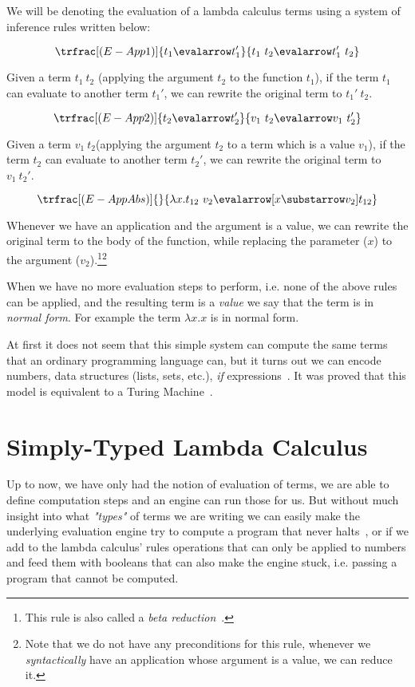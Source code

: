 We will be denoting the evaluation of a lambda calculus terms using a system of inference rules written below:

\[
       \trfrac[(E-App1)]
       {t_1 \evalarrow t_1'}
       {t_1\ t_2 \evalarrow t_1'\ t_2}
\]

Given a term $t_1\ t_2$ (applying the argument $t_2$ to the function $t_1$), if the term $t_1$ can evaluate to another term $t_1'$, we can rewrite the original term to $t_1'\ t_2$.


\[
       \trfrac[(E-App2)]
       {t_2 \evalarrow t_2'}
       {v_1\ t_2 \evalarrow v_1\ t_2'}
\]

Given a term $v_1\ t_2$(applying the argument $t_2$ to a term which is a value $v_1$), if the term $t_2$ can evaluate to another term $t_2'$, we can rewrite the original term to $v_1\ t_2'$.

\[
       \trfrac[(E-AppAbs)]
       {}
       {\lambda x.t_{12}\ v_2 \evalarrow [x \substarrow v_2]t_{12}}
\]

Whenever we have an application and the argument is a value, we can rewrite the original term to the body of the function, while replacing the parameter ($x$) to the argument ($v_2$).\footnote{This rule is also called a \emph{beta reduction}~\cite{tapl}.}\footnote{Note that we do not have any preconditions for this rule, whenever we \emph{syntactically} have an application whose argument is a value, we can reduce it.}

\begin{definition}
       When we have no more evaluation steps to perform, i.e. none of the above rules can be applied, and the resulting term is a \emph{value} we say that the term is in \emph{normal form}. For example the term $\lambda x.x$ is in normal form.
\end{definition}

At first it does not seem that this simple system can compute the same terms that an ordinary programming language can, but it turns out we can encode numbers, data structures (lists, sets, etc.), \emph{if} expressions~\cite{tapl}.
It was proved that this model is equivalent to a Turing Machine~\cite{lambda-church}.

\section{Simply-Typed Lambda Calculus}

Up to now, we have only had the notion of evaluation of terms, we are able to define computation steps and an engine can run those for us.
But without much insight into what \emph{"types"} of terms we are writing we can easily make the underlying evaluation engine try to compute a program that never halts~\cite{tapl}, or if we add to the lambda calculus' rules operations that can only be applied to numbers and feed them with booleans that can also make the engine stuck, i.e. passing a program that cannot be computed.

